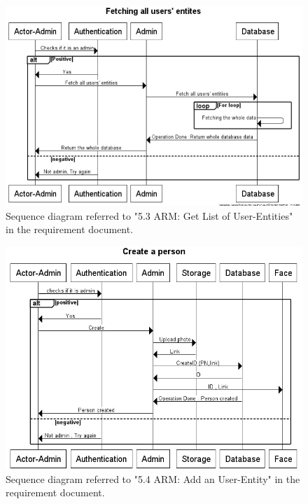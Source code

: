 \documentclass[a4paper,11pt]{article}
\begin{document}
\begin{figure}[ht!]
	\centering
	\includegraphics[width=150mm]{SequenceDiagrams/FetchAllUsers.jpg}
	\caption{Sequence diagram referred to "5.3 ARM: Get List of User-Entities" in the requirement document. \label{2}}
\end{figure}
\begin{figure}[ht!]
	\centering
	\includegraphics[width=150mm]{SequenceDiagrams/Create.jpg}
	\caption{Sequence diagram referred to "5.4 ARM: Add an User-Entity" in the requirement document. \label{3}}
\end{figure}
\end{document}
